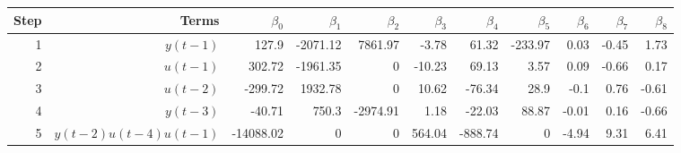 \begin{tabular}{rrrrrrrrrrr}
Step & Terms & $\beta_{0}$ & $\beta_{1}$ & $\beta_{2}$ & $\beta_{3}$ & $\beta_{4}$ & $\beta_{5}$ & $\beta_{6}$ & $\beta_{7}$ & $\beta_{8}$ \\ 
\hline 
1 & $y(t-1)$ & 127.9 & -2071.12 & 7861.97 & -3.78 & 61.32 & -233.97 & 0.03 & -0.45 & 1.73 \\ 
2 & $u(t-1)$ & 302.72 & -1961.35 & 0 & -10.23 & 69.13 & 3.57 & 0.09 & -0.66 & 0.17 \\ 
3 & $u(t-2)$ & -299.72 & 1932.78 & 0 & 10.62 & -76.34 & 28.9 & -0.1 & 0.76 & -0.61 \\ 
4 & $y(t-3)$ & -40.71 & 750.3 & -2974.91 & 1.18 & -22.03 & 88.87 & -0.01 & 0.16 & -0.66 \\ 
5 & $y(t-2)u(t-4)u(t-1)$ & -14088.02 & 0 & 0 & 564.04 & -888.74 & 0 & -4.94 & 9.31 & 6.41 \\ 
\hline 
\end{tabular}